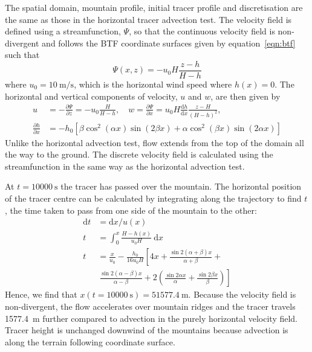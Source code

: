 \documentclass[twocol]{ametsoc}
\begin{document}
The spatial domain, mountain profile, initial tracer profile and discretisation are the same as those in the horizontal tracer advection test.  The velocity field is defined using a streamfunction, $\Psi$, so that the continuous velocity field is non-divergent and follows the BTF coordinate surfaces given by equation~\ref{eqn:btf} such that
\begin{equation}
	\Psi(x,z) = - u_0 H \frac{z - h}{H - h}
\end{equation}
where $u_0 = \SI{10}{\meter\per\second}$, which is the horizontal wind speed where $h(x) = 0$.
The horizontal and vertical components of velocity, $u$ and $w$, are then given by
\begin{align}
	u &= - \frac{\partial \Psi}{\partial z} = - u_0 \frac{H}{H - h}, \quad w = \frac{\partial \Psi}{\partial x} = u_0 H \frac{\mathrm{d} h}{\mathrm{d} x} \frac{z - H}{\left( H - h \right)^2}, \nonumber \\
	\frac{\partial h}{\partial x} &= - h_0 \left[ 
		\beta \cos^2 \left( \alpha x \right) \sin \left( 2 \beta x \right) +
		\alpha \cos^2 \left( \beta x \right) \sin \left( 2 \alpha x \right)
	\right]
\end{align}
Unlike the horizontal advection test, flow extends from the top of the domain all the way to the ground.  The discrete velocity field is calculated using the streamfunction in the same way as the horizontal advection test.

At $t = \SI{10000}{\second}$ the tracer has passed over the mountain.  The horizontal position of the tracer centre can be calculated by integrating along the trajectory to find $t$, the time taken to pass from one side of the mountain to the other:
\begin{align}
	\mathrm{d}t &= \mathrm{d}x / u(x) \\
	t &= \int_0^x \frac{H - h(x)}{u_0 H}\:\mathrm{d}x \\
	t &= \frac{x}{u_0} - \frac{h_0}{16 u_0 H} \left[ 4x + \frac{\sin 2 (\alpha + \beta) x}{\alpha + \beta} \right.+ \nonumber \\
   &\ \left. \frac{\sin 2(\alpha - \beta) x}{\alpha - \beta} + 2 \left( \frac{\sin 2\alpha x}{\alpha} + \frac{\sin 2\beta x}{\beta} \right) \right]
\end{align}
Hence, we find that \(x(t=\SI{10000}{\second}) = \SI{51577.4}{\meter}\).  Because the velocity field is non-divergent, the flow accelerates over mountain ridges and the tracer travels \SI{1577.4}{\meter} further compared to advection in the purely horizontal velocity field.  Tracer height is unchanged downwind of the mountains because advection is along the terrain following coordinate surface.
\end{document}
